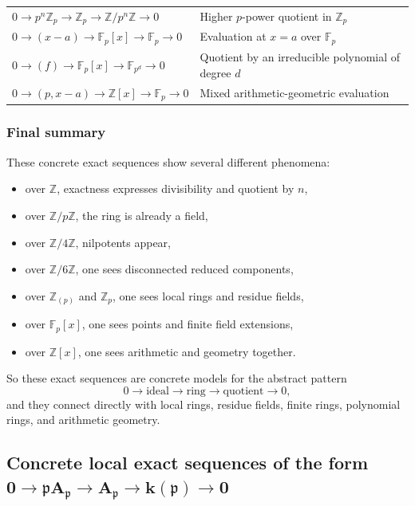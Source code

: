 \documentclass[12pt,a4paper]{article}
\theoremstyle{notespace}
\newcommand{\mf}{\mathfrak}
\theoremstyle{definition}
\begin{document}
\begin{center}
\begin{longtable}{>{\raggedright\arraybackslash}p{}
			>{\raggedright\arraybackslash}p{}}
		\(
		0\to p^n\mathbb Z_p \to \mathbb Z_p \to \mathbb Z/p^n\mathbb Z \to 0
		\)
		&
		Higher \(p\)-power quotient in \(\mathbb Z_p\)
		\\
		
		\(
		0\to (x-a)\to \mathbb F_p[x] \to \mathbb F_p \to 0
		\)
		&
		Evaluation at \(x=a\) over \(\mathbb F_p\)
		\\
		
		\(
		0\to (f)\to \mathbb F_p[x] \to \mathbb F_{p^d} \to 0
		\)
		&
		Quotient by an irreducible polynomial of degree \(d\)
		\\
		
		\(
		0\to (p,x-a)\to \mathbb Z[x] \to \mathbb F_p \to 0
		\)
		&
		Mixed arithmetic-geometric evaluation
		\\
	\end{longtable}
\end{center}

\subsubsection{Final summary}

These concrete exact sequences show several different phenomena:

\begin{itemize}
	\item over \(\mathbb Z\), exactness expresses divisibility and quotient by \(n\),
	\item over \(\mathbb Z/p\mathbb Z\), the ring is already a field,
	\item over \(\mathbb Z/4\mathbb Z\), nilpotents appear,
	\item over \(\mathbb Z/6\mathbb Z\), one sees disconnected reduced components,
	\item over \(\mathbb Z_{(p)}\) and \(\mathbb Z_p\), one sees local rings and residue fields,
	\item over \(\mathbb F_p[x]\), one sees points and finite field extensions,
	\item over \(\mathbb Z[x]\), one sees arithmetic and geometry together.
\end{itemize}

So these exact sequences are concrete models for the abstract pattern
\[
0 \longrightarrow \text{ideal} \longrightarrow \text{ring} \longrightarrow \text{quotient} \longrightarrow 0,
\]
and they connect directly with local rings, residue fields, finite rings, polynomial rings, and arithmetic geometry.

\subsection{Concrete local exact sequences of the form
	\(\boldsymbol{0 \to \mf p A_{\mf p} \to A_{\mf p} \to k(\mf p) \to 0}\)}
\end{document}
